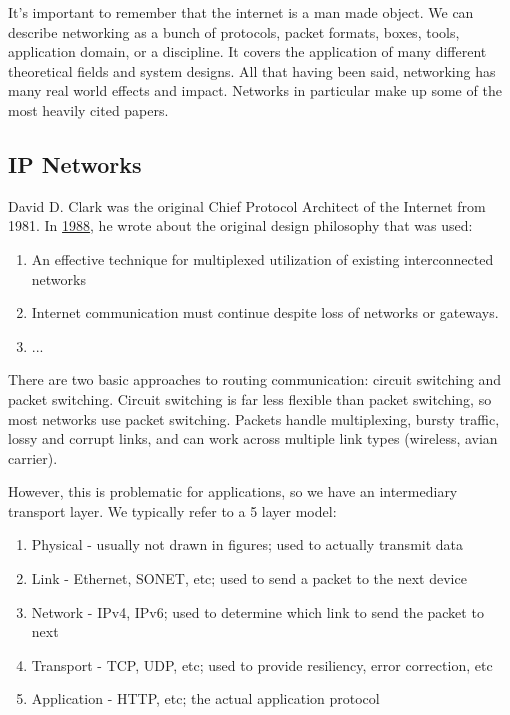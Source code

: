 \documentclass{idc_msc}
\begin{document}
It's important to remember that the internet is a man made object.
We can describe networking as a bunch of protocols, packet formats, boxes, tools, application domain, or a discipline.
It covers the application of many different theoretical fields and system designs.
All that having been said, networking has many real world effects and impact.
Networks in particular make up some of the most heavily cited papers.


\subsection{IP Networks}

David D. Clark was the original Chief Protocol Architect of the Internet from 1981.
In \href{http://ccr.sigcomm.org/archive/1995/jan95/ccr-9501-clark.pdf}{1988}, he wrote about the original design philosophy that was used:

\begin{enumerate}
  \item An effective technique for multiplexed utilization of existing interconnected networks
  \item Internet communication must continue despite loss of networks or gateways.
  \item ...
\end{enumerate}

There are two basic approaches to routing communication: circuit switching and packet switching.
Circuit switching is far less flexible than packet switching, so most networks use packet switching.
Packets handle multiplexing, bursty traffic, lossy and corrupt links, and can work across multiple link types (wireless, avian carrier).

However, this is problematic for applications, so we have an intermediary transport layer.
We typically refer to a 5 layer model:

\begin{enumerate}
  \item Physical - usually not drawn in figures; used to actually transmit data
  \item Link - Ethernet, SONET, etc; used to send a packet to the next device
  \item Network - IPv4, IPv6; used to determine which link to send the packet to next
  \item Transport - TCP, UDP, etc; used to provide resiliency, error correction, etc
  \item Application - HTTP, etc; the actual application protocol
\end{enumerate}
\end{document}
